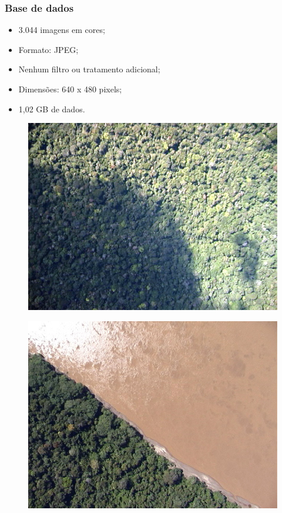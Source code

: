 \documentclass[t]{beamer}
\begin{document}
\begin{frame}
	\frametitle{Base de dados}

	\begin{itemize}
		\item 3.044 imagens em cores;
		\item Formato: JPEG;
		\item Nenhum filtro ou tratamento adicional;
		\item Dimensões: 640 x 480 pixels;
		\item 1,02 GB de dados.
	\end{itemize}

	\begin{multicols}{3}
		\begin{figure}
			\includegraphics[scale=0.3]{imgs/amostra1}
		\end{figure}
		\begin{figure}
			\includegraphics[scale=0.3]{imgs/amostra2}

\end{figure}
\end{multicols}
\end{frame}
\end{document}

